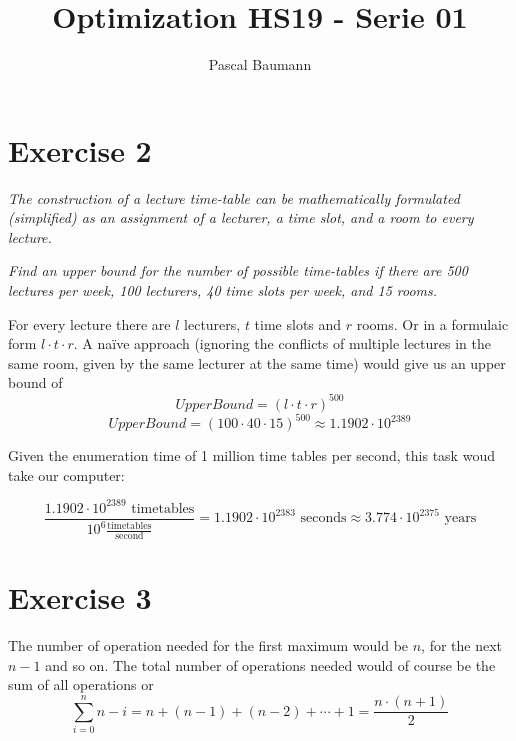 \documentclass[11pt]{article}
\begin{document}
\title{Optimization HS19 - Serie 01}
\author{Pascal Baumann}
\maketitle

\graphicspath{{./img/}}

\section{Exercise 2}
\textit{The construction of a lecture time-table can be mathematically formulated (simplified) as an assignment of a lecturer, a time slot, and a room to every lecture.}

\textit{Find an upper bound for the number of possible time-tables if there are 500 lectures per week, 100 lecturers, 40 time slots per week, and 15 rooms.}

\vspace{1em}

For every lecture there are $l$ lecturers, $t$ time slots and $r$ rooms. Or in a formulaic form $l\cdot t\cdot r$. A naïve approach (ignoring the conflicts of multiple lectures in the same room, given by the same lecturer at the same time) would give us an upper bound of
\begin{equation*}
    UpperBound = (l\cdot t \cdot r)^{500}
\end{equation*}
\begin{equation*}
    UpperBound = (100\cdot 40\cdot 15)^{500} \approx 1.1902\cdot 10^{2389} 
\end{equation*}

Given the enumeration time of 1 million time tables per second, this task woud take our computer:

\begin{equation*}
    \frac{1.1902\cdot 10^{2389}\text{ timetables}}{10^6\frac{\text{timetables}}{\text{second}}} = 1.1902\cdot 10^{2383}\text{ seconds} \approx 3.774\cdot 10^{2375}\text{ years}
\end{equation*}

\section{Exercise 3}

The number of operation needed for the first maximum would be $n$, for the next $n-1$ and so on. The total number of operations needed would of course be the sum of all operations or
\begin{equation*}
    \sum_{i=0}^n{n-i} = n + (n-1) + (n-2) + \cdots + 1 = \frac{n\cdot (n+1)}{2}
\end{equation*}
\end{document}
